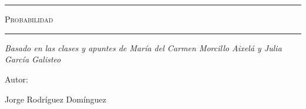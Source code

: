 \begin{titlepage}
\centering
{\bfseries\LARGE \ \par}
\vspace{1cm}
{\scshape\Large \ \par}
\vspace{3cm}
\rule{\linewidth}{0.5mm}
{\scshape\Huge Probabilidad \par}
\rule{\linewidth}{0.5mm} \par
\vspace{3cm}
{\itshape\Large Basado en las clases y apuntes de María del Carmen Morcillo Aixelá y Julia García Galisteo \par}
\vfill
{\Large Autor: \par}
{\Large Jorge Rodríguez Domínguez \par}
\vfill
\end{titlepage}
\tableofcontents